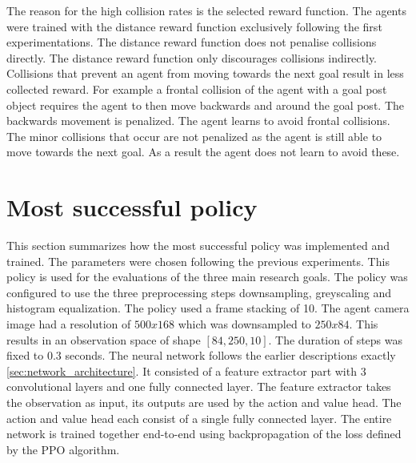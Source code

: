 The reason for the high collision rates is the selected reward function. The agents were trained with the distance reward function exclusively following the first experimentations. The distance reward function does not penalise collisions directly. The distance reward function only discourages collisions indirectly. Collisions that prevent an agent from moving towards the next goal result in less collected reward. For example a frontal collision of the agent with a goal post object requires the agent to then move backwards and around the goal post. The backwards movement is penalized. The agent learns to avoid frontal collisions.
The minor collisions that occur are not penalized as the agent is still able to move towards the next goal. As a result the agent does not learn to avoid these.




\section{Most successful policy}


This section summarizes how the most successful policy was implemented and trained. The parameters were chosen following the previous experiments. This policy is used for the evaluations of the three main research goals.
The policy was configured to use the three preprocessing steps downsampling, greyscaling and histogram equalization. The policy used a frame stacking of 10. The agent camera image had a resolution of $500x168$ which was downsampled to $250x84$. This results in an observation space of shape $[84, 250, 10]$. The duration of steps was fixed to $0.3$ seconds.
The neural network follows the earlier descriptions exactly \ref{sec:network_architecture}. It consisted of a feature extractor part with 3 convolutional layers and one fully connected layer. The feature extractor takes the observation as input, its outputs are used by the action and value head. The action and value head each consist of a single fully connected layer. The entire network is trained together end-to-end using backpropagation of the loss defined by the PPO algorithm.


